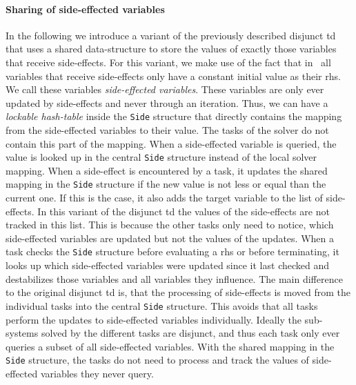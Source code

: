     \paragraph{Sharing of side-effected variables} In the following we introduce a variant of the previously described disjunct \ac{td} that uses a shared data-structure to store the values of exactly those variables that receive side-effects. For this variant, we make use of the fact that in \gob\ all variables that receive side-effects only have a constant initial value as their \ac{rhs}. We call these variables \textit{side-effected variables}. These variables are only ever updated by side-effects and never through an iteration. Thus, we can have a \textit{lockable hash-table} inside the \texttt{Side} structure that directly contains the mapping from the side-effected variables to their value. The tasks of the solver do not contain this part of the mapping. When a side-effected variable is queried, the value is looked up in the central \texttt{Side} structure instead of the local solver mapping. When a side-effect is encountered by a task, it updates the shared mapping in the \texttt{Side} structure if the new value is not less or equal than the current one. If this is the case, it also adds the target variable to the list of side-effects. In this variant of the disjunct \ac{td} the values of the side-effects are not tracked in this list. This is because the other tasks only need to notice, which side-effected variables are updated but not the values of the updates. When a task checks the \texttt{Side} structure before evaluating a \ac{rhs} or before terminating, it looks up which side-effected variables were updated since it last checked and destabilizes those variables and all variables they influence. The main difference to the original disjunct \ac{td} is, that the processing of side-effects is moved from the individual tasks into the central \texttt{Side} structure. This avoids that all tasks perform the updates to side-effected variables individually. Ideally the sub-systems solved by the different tasks are disjunct, and thus each task only ever queries a subset of all side-effected variables. With the shared mapping in the \texttt{Side} structure, the tasks do not need to process and track the values of side-effected variables they never query.
    